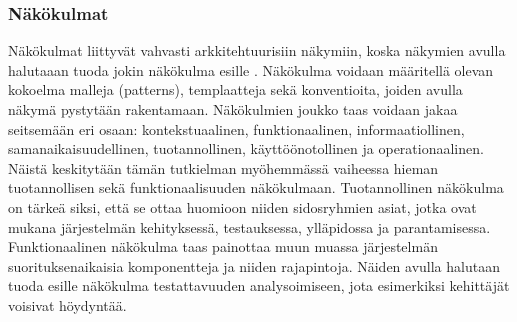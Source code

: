 \documentclass[finnish]{tktltiki2}
\numberwithin{table}{section}
\theoremstyle{definition}
\theoremstyle{remark}
\begin{document}



\subsubsection{Näkökulmat}
Näkökulmat liittyvät vahvasti arkkitehtuurisiin näkymiin, koska näkymien avulla halutaaan tuoda jokin näkökulma esille \citep[s. 36-42]{Rozanski:2011:SSA:2072649}. Näkökulma voidaan määritellä olevan kokoelma malleja (patterns), templaatteja sekä konventioita, joiden avulla näkymä pystytään rakentamaan.  Näkökulmien joukko taas voidaan jakaa seitsemään eri osaan: kontekstuaalinen, funktionaalinen, informaatiollinen, samanaikaisuudellinen, tuotannollinen, käyttöönotollinen ja operationaalinen. Näistä keskitytään tämän tutkielman myöhemmässä vaiheessa hieman tuotannollisen sekä funktionaalisuuden näkökulmaan. Tuotannollinen näkökulma on tärkeä siksi, että se ottaa huomioon niiden sidosryhmien asiat, jotka ovat mukana järjestelmän kehityksessä, testauksessa, ylläpidossa ja parantamisessa. Funktionaalinen näkökulma taas painottaa muun muassa järjestelmän suorituksenaikaisia komponentteja ja niiden rajapintoja. Näiden avulla halutaan tuoda esille näkökulma testattavuuden analysoimiseen, jota esimerkiksi kehittäjät voisivat höydyntää.
\end{document}
